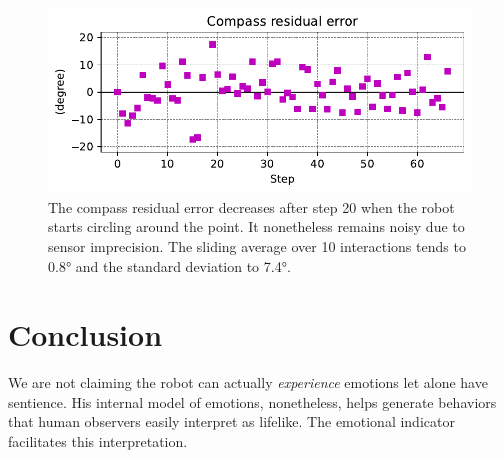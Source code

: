 \documentclass[runningheads]{llncs}
\begin{document}
\begin{figure}
	\includegraphics[width=\textwidth]{04_Compass.pdf}
	\caption{The compass residual error decreases after step 20 when the robot starts circling around the point.
	It nonetheless remains noisy due to sensor imprecision.
	The sliding average over 10 interactions tends to 0.8° and the standard deviation to 7.4°.} \label{fig:compass}
\end{figure}

\section{Conclusion}

We are not claiming the robot can actually \textit{experience} emotions let alone have sentience. 
His internal model of emotions, nonetheless, helps generate behaviors that human observers easily interpret as lifelike. 
The emotional indicator facilitates this interpretation. 

\begin{credits}


\end{credits}
%
%
%


%
\end{document}
